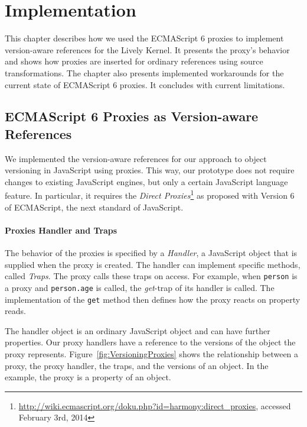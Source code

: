 

\chapter{Implementation} \label{chapter:IMPLEMENTATION}

This chapter describes how we used the ECMAScript 6 proxies to implement version-aware references for the Lively Kernel.
It presents the proxy's behavior and shows how proxies are inserted for ordinary references using source transformations.
The chapter also presents implemented workarounds for the current state of ECMAScript 6 proxies.
It concludes with current limitations.


\section{ECMAScript 6 Proxies as Version-aware References} \label{sec:IMPLEMENTATION:1}

We implemented the version-aware references for our approach to object versioning in JavaScript using proxies.
This way, our prototype does not require changes to existing JavaScript engines, but only a certain JavaScript language feature.
In particular, it requires the \emph{Direct Proxies}\footnote{\url{http://wiki.ecmascript.org/doku.php?id=harmony:direct_proxies}, accessed February 3rd, 2014} as proposed with Version 6 of ECMAScript, the next standard of JavaScript.

\subsubsection{Proxies Handler and Traps}

The behavior of the proxies is specified by a \emph{Handler}, a JavaScript object that is supplied when the proxy is created.
The handler can implement specific methods, called \emph{Traps}.
The proxy calls these traps on access.
For example, when \lstinline{person} is a proxy and \lstinline{person.age} is called, the \emph{get}-trap of its handler is called.
The implementation of the \lstinline{get} method then defines how the proxy reacts on property reads.

The handler object is an ordinary JavaScript object and can have further properties.
Our proxy handlers have a reference to the versions of the object the proxy represents.
Figure~\ref{fig:VersioningProxies} shows the relationship between a proxy, the proxy handler, the traps, and the versions of an object.
In the example, the proxy is a property of an object.

